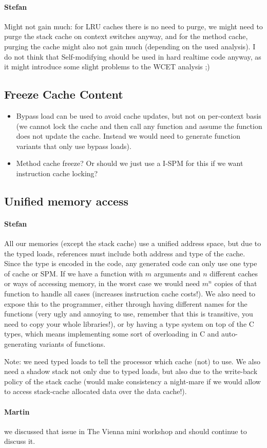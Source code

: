 \documentclass{IEEEtran}
\newcommand{\comment}[3]{\paragraph*{\textbf{#1}}{\color{#3}#2}}
\newcommand{\martin}[1]{\comment{Martin}{#1}{Blue}}
\newcommand{\stefan}[1]{\comment{Stefan}{#1}{RoyalPurple}}
\begin{document}
\stefan{Might not gain much: for LRU caches there is no need to purge, we might need to purge the stack cache on context switches anyway,
and for the method cache, purging the cache might also not gain much (depending on the used analysis). I do not think that Self-modifying
should be used in hard realtime code anyway, as it might introduce some slight problems to the WCET analysis ;) }

\subsection{Freeze Cache Content}

\begin{itemize}
  \item Bypass load can be used to avoid cache updates, but not on per-context basis (we cannot lock the cache and then call any function
  and assume the function does not update the cache. Instead we would need to generate function variants that only use bypass loads).
  \item Method cache freeze? Or should we just use a I-SPM for this if we want instruction cache locking?
\end{itemize}

\subsection{Unified memory access}

\stefan{All our memories (except the stack cache) use a unified address space, but due to the typed loads, references must include both address and
type of the cache. Since the type is encoded in the code, any generated code can only use one type of cache or SPM. 
If we have a function with $m$ arguments and $n$ different caches or ways of accessing
memory, in the worst case we would need $m^n$ copies of that function to handle all cases (increases instruction cache costs!). We also need to expose this to the programmer,
either through having different names for the functions (very ugly and annoying to use, remember that this is transitive, you need to copy
your whole libraries!), or by having a type system on top of the C types, which means implementing some sort of overloading in C and
auto-generating variants of functions.

Note: we need typed loads to tell the processor which cache (not) to use. We also need a shadow stack not only due to typed loads,
but also due to the write-back policy of the stack cache (would make consistency a night-mare if we would allow to access stack-cache
allocated data over the data cache!).
}
\martin{we discussed that issue in The Vienna mini workshop and should continue to discuss it.}
\end{document}
